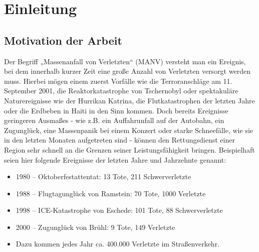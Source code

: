 \chapter{Einleitung}
\section{Motivation der Arbeit}

Der Begriff „Massenanfall von Verletzten“ (MANV) versteht man ein Ereignis, bei dem innerhalb
kurzer Zeit eine große Anzahl von Verletzten versorgt werden muss. Hierbei mögen einem zuerst
Vorfälle wie die Terroranschläge am 11. September 2001, die Reaktorkatastrophe von Tschernobyl oder
spektakuläre Naturereignisse wie der Hurrikan Katrina, die Flutkatastrophen der letzten Jahre oder die
Erdbeben in Haiti in den Sinn kommen.
Doch bereits Ereignisse geringeren Ausmaßes - wie z.B. ein Auffahrunfall auf der Autobahn, ein
Zugunglück, eine Massenpanik bei einem Konzert oder starke Schneefälle, wie sie in den letzten
Monaten aufgetreten sind - können den Rettungsdienst einer Region sehr schnell an die Grenzen seiner
Leistungsfähigkeit bringen.
Beispielhaft seien hier folgende Ereignisse der letzten Jahre und Jahrzehnte genannt:

\begin{itemize}
    \item 1980 – Oktoberfestattentat: 13 Tote, 211 Schwerverletzte
    \item 1988 – Flugtagunglück von Ramstein: 70 Tote, 1000 Verletzte
    \item 1998 – ICE-Katastrophe von Eschede: 101 Tote, 88 Schwerverletzte
    \item 2000 – Zugunglück von Brühl: 9 Tote, 149 Verletzte
    \item Dazu kommen jedes Jahr ca. 400.000 Verletzte im Straßenverkehr.
\end{itemize}

